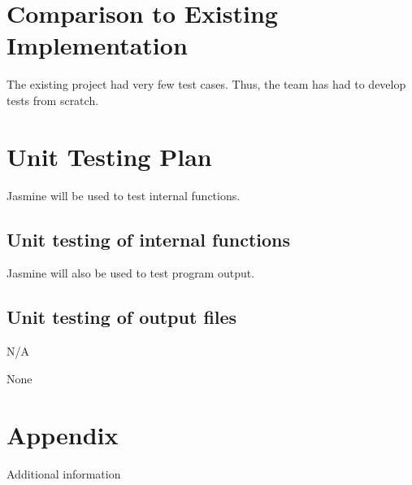 


\section{Comparison to Existing Implementation}	
The existing project had very few test cases. Thus, the team has had to develop tests from scratch.

\section{Unit Testing Plan}
Jasmine will be used to test internal functions.

\subsection{Unit testing of internal functions}
Jasmine will also be used to test program output.

\subsection{Unit testing of output files}		
N/A




None
\newpage

\section{Appendix}

Additional information

